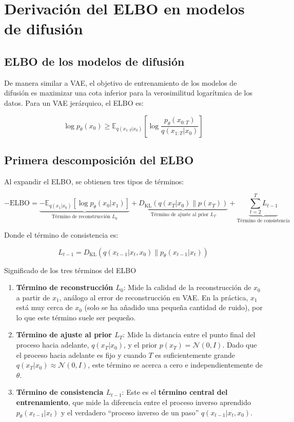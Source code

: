 \section{Derivación del ELBO en modelos de difusión}

\subsection{ELBO de los modelos de difusión}

De manera similar a VAE, el objetivo de entrenamiento de los modelos de difusión es maximizar una cota inferior para la verosimilitud logarítmica de los datos. Para un VAE jerárquico, el ELBO es:

$$\log p_\theta(x_0) \geq \mathbb{E}_{q(x_{1:T}|x_0)} \left[ \log \frac{p_\theta(x_{0:T})}{q(x_{1:T}|x_0)} \right]$$

\subsection{Primera descomposición del ELBO}

Al expandir el ELBO, se obtienen tres tipos de términos:

$$-\text{ELBO} = \underbrace{-\mathbb{E}_{q(x_1|x_0)}[\log p_\theta(x_0|x_1)]}_{\text{Término de reconstrucción } L_0} + \underbrace{D_{\text{KL}}(q(x_T|x_0) \| p(x_T))}_{\text{Término de ajuste al prior } L_T} + \underbrace{\sum_{t=2}^{T} L_{t-1}}_{\text{Término de consistencia}}$$

Donde el término de consistencia es:

$$L_{t-1} = D_{\text{KL}}(q(x_{t-1}|x_t, x_0) \| p_\theta(x_{t-1}|x_t))$$

\begin{importantbox}{Significado de los tres términos del ELBO}
\begin{enumerate}
    \item \textbf{Término de reconstrucción $L_0$}: Mide la calidad de la reconstrucción de $x_0$ a partir de $x_1$, análogo al error de reconstrucción en VAE. En la práctica, $x_1$ está muy cerca de $x_0$ (solo se ha añadido una pequeña cantidad de ruido), por lo que este término suele ser pequeño.
    \item \textbf{Término de ajuste al prior $L_T$}: Mide la distancia entre el punto final del proceso hacia adelante, $q(x_T|x_0)$, y el prior $p(x_T) = \mathcal{N}(0, I)$. Dado que el proceso hacia adelante es fijo y cuando $T$ es suficientemente grande $q(x_T|x_0) \approx \mathcal{N}(0,I)$, este término se acerca a cero e independientemente de $\theta$.
    \item \textbf{Término de consistencia $L_{t-1}$}: Este es el \textbf{término central del entrenamiento}, que mide la diferencia entre el proceso inverso aprendido $p_\theta(x_{t-1}|x_t)$ y el verdadero ``proceso inverso de un paso'' $q(x_{t-1}|x_t, x_0)$.
\end{enumerate}
\end{importantbox}

